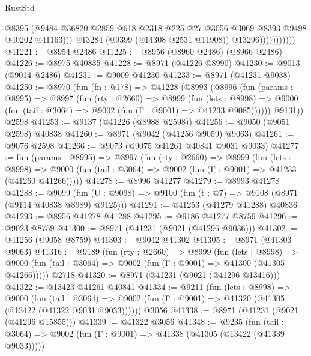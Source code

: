 \begin{lexlean}{RustStd}
\begin{coremodule}
                              @8395
                              (@9484
                                @36820
                                @2859
                                @618
                                @2318
                                @225
                                @27
                                @3056
                                @3069
                                @8393
                                @9498
                                @40202
                                @41163)))
                          @13284
                          (@9399 (@14308 @2531 @11908))
                          @13296)))))))))))
@41221 := @8954 @2486
@41225 := @8956 (@8960 @2486) (@8966 @2486)
@41226 := @8975 @40835
@41228 := @8971 (@41226 @8990)
@41230 := @9013 (@9014 @2486)
@41231 := @9009 @41230
@41233 := @8971 (@41231 @9038)
@41250 := @8970
    (fun (fn : @178) =>
    @41228
      (@8993
        (@8996
          (fun (params : @8995) =>
          @8997
            (fun (rty : @2660) =>
            @8999
              (fun (lets : @8998) =>
              @9000 (fun (tail : @3064) => @9002 (fun (Γ : @9001) => @41233 @9085))))))
        @9131))
    @2598
@41253 := @9137 (@41226 (@8988 @2598))
@41256 := @9050 (@9051 @2598) @40838
@41260 := @8971 (@9042 (@41256 @9059) @9063)
@41261 := @9076 @2598
@41266 := @9073 (@9075 @41261 @40841 @9031 @9033)
@41277 := fun (params : @8995) =>
  @8997
    (fun (rty : @2660) =>
    @8999
      (fun (lets : @8998) =>
      @9000 (fun (tail : @3064) => @9002 (fun (Γ : @9001) => @41233 (@41260 @41266)))))
@41278 := @8996 @41277
@41279 := @8993 @41278
@41288 := @9099
    (fun (U : @9098) => @9100 (fun (t : @7) => @9108 (@8971 (@9114 @40838 @8989) @9125)))
@41291 := @41253 (@41279 @41288) @40836
@41293 := @8956 @41278 @41288
@41295 := @9186 @41277 @8759
@41296 := @9023 @8759
@41300 := @8971 (@41231 (@9021 (@41296 @9036)))
@41302 := @41256 (@9058 @8759)
@41303 := @9042 @41302
@41305 := @8971 (@41303 @9063)
@41316 := @9189
    (fun (rty : @2660) =>
    @8999
      (fun (lets : @8998) =>
      @9000 (fun (tail : @3064) => @9002 (fun (Γ : @9001) => @41300 (@41305 @41266)))))
    @2718
@41320 := @8971 (@41231 (@9021 (@41296 @13416)))
@41322 := @13423 @41261 @40841
@41334 := @9211
    (fun (lets : @8998) =>
    @9000
      (fun (tail : @3064) =>
      @9002 (fun (Γ : @9001) => @41320 (@41305 (@13422 (@41322 @9031 @9033))))))
    @3056
@41338 := @8971 (@41231 (@9021 (@41296 @15855)))
@41339 := @41322 @3056
@41348 := @9235
    (fun (tail : @3064) => @9002 (fun (Γ : @9001) => @41338 (@41305 (@13422 (@41339 @9033)))))

\end{coremodule}
\end{lexlean}

